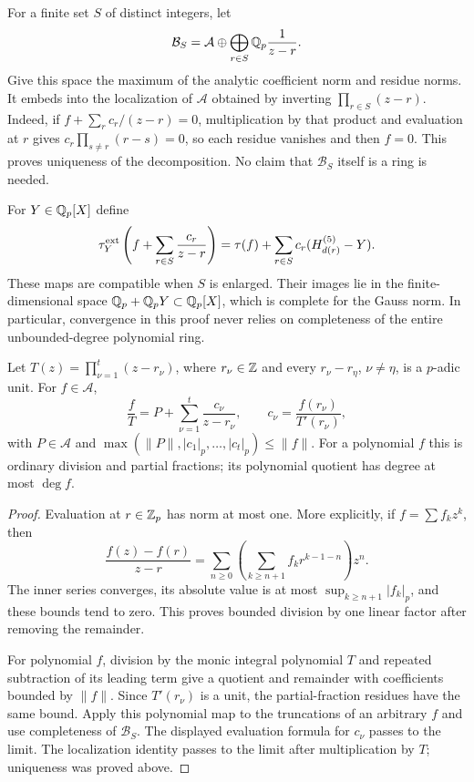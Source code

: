 For a finite set $S$ of distinct integers, let
\[
 \mathcal B_S=\mathcal A\oplus\bigoplus_{r\in S}\mathbb Q_p\frac1{z-r}.
\]
Give this space the maximum of the analytic coefficient norm and residue
norms. It embeds into the localization of $\mathcal A$ obtained by
inverting $\prod_{r\in S}(z-r)$. Indeed, if
$f+\sum_rc_r/(z-r)=0$, multiplication by that product and evaluation at
$r$ gives $c_r\prod_{s\ne r}(r-s)=0$, so each residue vanishes and then
$f=0$. This proves uniqueness of the decomposition. No claim that
$\mathcal B_S$ itself is a ring is needed.

For $Y\in\mathbb Q_p[X]$ define
\begin{equation}\label{eq:taudirectsum}
 \tau^{\mathrm{ext}}_Y\left(f+\sum_{r\in S}\frac{c_r}{z-r}\right)
   =\tau(f)+\sum_{r\in S}c_r(H^{(5)}_{d(r)}-Y).
\end{equation}
These maps are compatible when $S$ is enlarged. Their images lie in the
finite-dimensional space $\mathbb Q_p+\mathbb Q_p Y\subset\mathbb Q_p[X]$, which is complete for
the Gauss norm. In particular, convergence in this proof never relies on
completeness of the entire unbounded-degree polynomial ring.

\begin{lemma}
\label{lem:boundeddivision}
Let $T(z)=\prod_{\nu=1}^t(z-r_\nu)$, where $r_\nu\in\mathbb Z$ and every
$r_\nu-r_\eta$, $\nu\ne\eta$, is a $p$-adic unit. For $f\in\mathcal A$,
\[
 \frac fT=P+\sum_{\nu=1}^t\frac{c_\nu}{z-r_\nu},\qquad
 c_\nu=\frac{f(r_\nu)}{T'(r_\nu)},
\]
with $P\in\mathcal A$ and
$\max(\|P\|,|c_1|_p,\ldots,|c_t|_p)\le\|f\|$.
For a polynomial $f$ this is ordinary division and partial fractions;
its polynomial quotient has degree at most $\deg f$.
\end{lemma}
\begin{proof}
Evaluation at $r\in\mathbb Z_p$ has norm at most one. More explicitly, if
$f=\sum f_kz^k$, then
\[
 \frac{f(z)-f(r)}{z-r}=\sum_{n\ge0}
         \left(\sum_{k\ge n+1}f_kr^{k-1-n}\right)z^n.
\]
The inner series converges, its absolute value is at most
$\sup_{k\ge n+1}|f_k|_p$, and these bounds tend to zero. This proves
bounded division by one linear factor after removing the remainder.

For polynomial $f$, division by the monic integral polynomial $T$ and
repeated subtraction of its leading term give a quotient and remainder
with coefficients bounded by $\|f\|$. Since $T'(r_\nu)$ is a unit, the
partial-fraction residues have the same bound. Apply this polynomial map
to the truncations of an arbitrary $f$ and use completeness of
$\mathcal B_S$. The displayed evaluation formula for $c_\nu$ passes to
the limit. The localization identity passes to the limit after
multiplication by $T$; uniqueness was proved above.
\end{proof}

